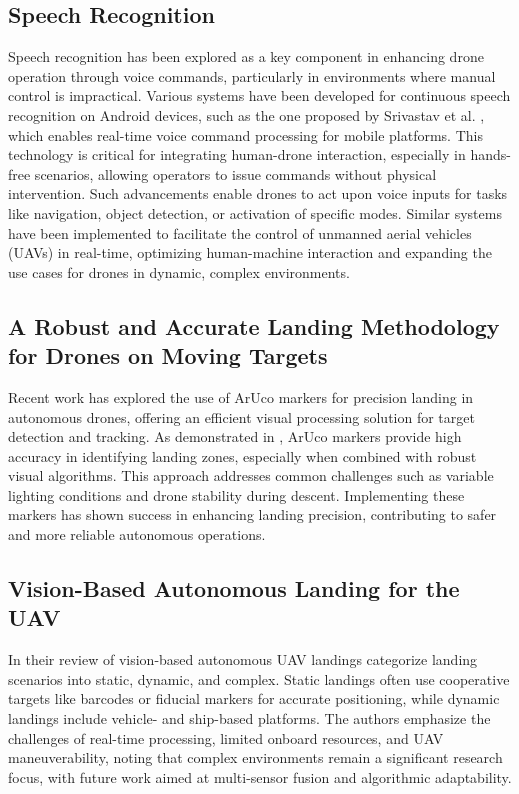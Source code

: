 \documentclass[unnumsec,webpdf,modern,large]{mam-authoring-template}%
\begin{document}
\subsection{Speech Recognition}
Speech recognition has been explored as a key component in enhancing drone operation through voice commands, particularly in environments where manual control is impractical. Various systems have been developed for continuous speech recognition on Android devices, such as the one proposed by Srivastav et al. \cite{SpeechRecognition}, which enables real-time voice command processing for mobile platforms.
This technology is critical for integrating human-drone interaction, especially in hands-free scenarios, allowing operators to issue commands without physical intervention. Such advancements enable drones to act upon voice inputs for tasks like navigation, object detection, or activation of specific modes. Similar systems have been implemented to facilitate the control of unmanned aerial vehicles (UAVs) in real-time, optimizing human-machine interaction and expanding the use cases for drones in dynamic, complex environments.

\subsection{A Robust and Accurate Landing Methodology for Drones on Moving Targets}
Recent work has explored the use of ArUco markers for precision landing in autonomous drones, offering an efficient visual processing solution for target detection and tracking. As demonstrated in \cite{drones6040098}, ArUco markers provide high accuracy in identifying landing zones, especially when combined with robust visual algorithms. This approach addresses common challenges such as variable lighting conditions and drone stability during descent. Implementing these markers has shown success in enhancing landing precision, contributing to safer and more reliable autonomous operations.

\subsection{Vision-Based Autonomous Landing for the UAV}
In their review of vision-based autonomous UAV landings \cite{aerospace9110634} categorize landing scenarios into static, dynamic, and complex. Static landings often use cooperative targets like barcodes or fiducial markers for accurate positioning, while dynamic landings include vehicle- and ship-based platforms. The authors emphasize the challenges of real-time processing, limited onboard resources, and UAV maneuverability, noting that complex environments remain a significant research focus, with future work aimed at multi-sensor fusion and algorithmic adaptability.
\end{document}
